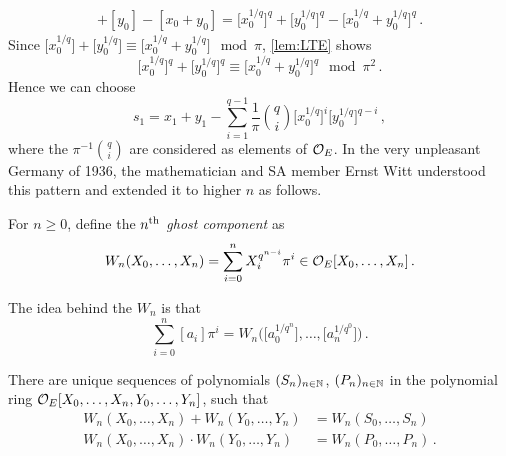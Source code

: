 \begin{align*}
	[x_0]+[y_0]-[x_0+y_0]=\big[x_0^{1/q}\big]^q+\big[y_0^{1/q}\big]^q-\big[x_0^{1/q}+y_0^{1/q}\big]^q\,.
\end{align*}
Since $\big[x_0^{1/q}\big]+\big[y_0^{1/q}\big]\equiv\big[x_0^{1/q}+y_0^{1/q}\big]\mod \pi$, \cref{lem:LTE} shows
\begin{equation*}
	\big[x_0^{1/q}\big]^q+\big[y_0^{1/q}\big]^q\equiv\big[x_0^{1/q}+y_0^{1/q}\big]^q\mod \pi^2\,.
\end{equation*}
Hence we can choose
\begin{equation*}
	s_1=x_1+y_1-\sum_{i=1}^{q-1}\frac{1}{\pi}\binom{q}{i}\big[x_0^{1/q}\big]^i\big[y_0^{1/q}\big]^{q-i}\,,
\end{equation*}
where the $\pi^{-1}\binom{q}{i}$ are considered as elements of $\mathcal{O}_E$. In the very unpleasant Germany of 1936, the mathematician and SA member Ernst Witt understood this pattern and extended it to higher $n$ as follows.
\begin{defi}
	For $n\geq 0$, define the \emph{$n^{\text{th}}$ ghost component} as
	\begin{equation*}
		W_n(X_0,\dotsc,X_n)=\sum_{i=0}^{n}X_i^{q^{n-i}}\pi^i\in\mathcal{O}_E[X_0,\dotsc,X_n]\,.
	\end{equation*}
\end{defi}
\begin{urem}
The idea behind the $W_n$ is that 
\begin{equation*}
	\sum_{i=0}^n[a_i]\pi^i=W_n\Big(\big[a_0^{1/q^n}\big],\dotsc,\big[a_n^{1/q^0}\big]\Big)\,.
\end{equation*}
\end{urem}
\begin{prop}\label{prop:WittPolynomials}
	There are unique sequences of polynomials $(S_n)_{n\in \mathbb{N}}$, $(P_n)_{n\in\mathbb{N}}$ in the polynomial ring $\mathcal{O}_E[X_0,\ldots,X_n,Y_0,\ldots,Y_n]$, such that
	\begin{align*}
		W_n(X_0,\dotsc,X_n)+W_n(Y_0,\dotsc,Y_n)&=W_n(S_0,\dotsc,S_n)\\
		W_n(X_0,\dotsc,X_n)\cdot W_n(Y_0,\dotsc,Y_n)&=W_n(P_0,\dotsc,P_n)\,.
	\end{align*}
\end{prop}
